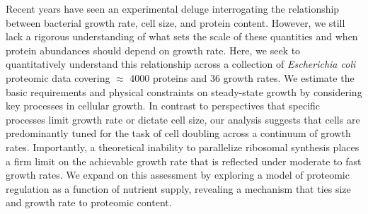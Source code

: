 

Recent years have seen an experimental deluge interrogating the relationship
between bacterial growth rate, cell size, and protein content. However, we still
lack a rigorous understanding of what sets the scale of these quantities and
when protein abundances should depend on growth rate. Here, we
seek to quantitatively understand this relationship across a collection of
\textit{Escherichia coli} proteomic data covering $\approx$ 4000 proteins and 36
growth rates. We estimate the basic requirements and physical constraints on
steady-state growth by considering key processes in cellular growth. In contrast to
perspectives that specific processes limit growth rate or dictate cell size, our
analysis suggests that cells are predominantly tuned for the task of cell doubling
across a continuum of growth rates. Importantly, a theoretical inability to
parallelize ribosomal synthesis places a firm limit on the achievable growth rate
that is reflected under moderate to fast growth rates. We expand on this
assessment by exploring a model of proteomic regulation as a function of
nutrient supply, revealing a mechanism that ties size and growth rate to proteomic content.
